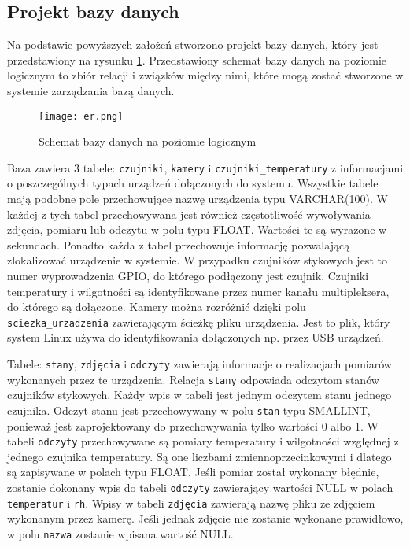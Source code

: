 \documentclass[a4paper,11pt,twoside]{article}
\begin{document}
\subsection{Projekt bazy danych}

Na podstawie powyższych założeń stworzono projekt bazy danych, który jest przedstawiony na rysunku \ref{fig: er}. Przedstawiony schemat bazy danych na poziomie logicznym to zbiór relacji i związków między nimi, które mogą zostać stworzone w systemie zarządzania bazą danych. 

\begin{figure}[h]
\texttt{[image: er.png]}
\caption{Schemat bazy danych na poziomie logicznym}
\label{fig: er}
\end{figure}

Baza zawiera 3 tabele: \texttt{czujniki}, \texttt{kamery} i \texttt{czujniki{\_}temperatury} z informacjami o poszczególnych typach urządzeń dołączonych do systemu. Wszystkie tabele mają podobne pole przechowujące nazwę urządzenia typu VARCHAR(100). W każdej z tych tabel przechowywana jest również częstotliwość wywoływania zdjęcia, pomiaru lub odczytu w polu typu FLOAT. Wartości te są wyrażone w sekundach. Ponadto każda z tabel przechowuje informację pozwalającą zlokalizować urządzenie w systemie. W przypadku czujników stykowych jest to numer wyprowadzenia GPIO, do którego podłączony jest czujnik. Czujniki temperatury i wilgotności są identyfikowane przez numer kanału multipleksera, do którego są dołączone. Kamery można rozróżnić dzięki polu \texttt{sciezka{\_}urzadzenia} zawierającym ścieżkę pliku urządzenia. Jest to plik, który system Linux używa do identyfikowania dołączonych np. przez USB urządzeń. 

Tabele: \texttt{stany}, \texttt{zdjęcia} i \texttt{odczyty} zawierają informacje o realizacjach pomiarów wykonanych przez te urządzenia. Relacja \texttt{stany} odpowiada odczytom stanów czujników stykowych. Każdy wpis w tabeli jest jednym odczytem  stanu jednego czujnika. Odczyt stanu jest przechowywany w polu \texttt{stan} typu SMALLINT, ponieważ jest zaprojektowany do przechowywania tylko wartości 0 albo 1. W tabeli \texttt{odczyty} przechowywane są pomiary temperatury i wilgotności względnej z jednego czujnika temperatury. Są one liczbami zmiennoprzecinkowymi i dlatego są zapisywane w polach typu FLOAT. Jeśli pomiar został wykonany błędnie, zostanie dokonany wpis do tabeli \texttt{odczyty} zawierający wartości NULL w polach \texttt{temperatur} i \texttt{rh}. Wpisy w tabeli \texttt{zdjęcia} zawierają nazwę pliku ze zdjęciem wykonanym przez kamerę. Jeśli jednak zdjęcie nie zostanie wykonane prawidłowo, w polu \texttt{nazwa} zostanie wpisana wartość NULL.
\end{document}
